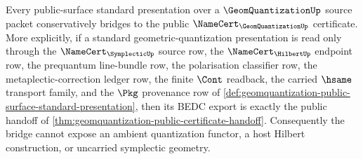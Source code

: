 \begin{theorem}
\label{thm:geomquantization-public-surface-standard-bridge}
Every public-surface standard presentation over a $\GeomQuantizationUp$ source packet conservatively bridges to the public $\NameCert_{\GeomQuantizationUp}$ certificate. More explicitly, if a standard geometric-quantization presentation is read only through the $\NameCert_{\SymplecticUp}$ source row, the $\NameCert_{\HilbertUp}$ endpoint row, the prequantum line-bundle row, the polarisation classifier row, the metaplectic-correction ledger row, the finite $\Cont$ readback, the carried $\hsame$ transport family, and the $\Pkg$ provenance row of \autoref{def:geomquantization-public-surface-standard-presentation}, then its BEDC export is exactly the public handoff of \autoref{thm:geomquantization-public-certificate-handoff}. Consequently the bridge cannot expose an ambient quantization functor, a host Hilbert construction, or uncarried symplectic geometry.
\end{theorem}
